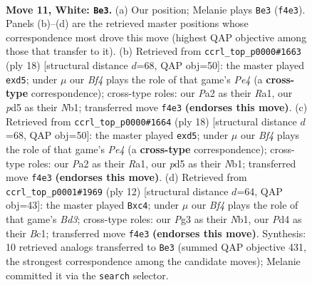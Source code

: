\documentclass[11pt]{article}
\begin{document}
\clearpage

\begin{figure}[p]\centering
\begin{subfigure}{0.46\textwidth}\centering
\resizebox{\linewidth}{!}{%
\newchessgame
\chessboard[
  setfen={rnbqr1k1/p5pp/2pb1n2/1p1p1p2/3P1B2/5NP1/PPQ1PPBP/RN3RK1 w - - 2 11},
  showmover=false,
  pgfstyle=straightmove, color=movearrow, markmove={f4-e3}
]}
\caption{}
\end{subfigure}\hfill
\begin{subfigure}{0.46\textwidth}\centering
\resizebox{\linewidth}{!}{%
\newchessgame
\chessboard[
  setfen={rnbqk2r/pp2ppbp/2n3p1/3p4/4P3/P5P1/1P2NPBP/RNBQK2R w KQkq - 1 10},
  showmover=false,
  pgfstyle=straightmove, color=movearrow, markmove={e4-d5}
]}
\caption{}
\end{subfigure}
\\[4pt]
\begin{subfigure}{0.46\textwidth}\centering
\resizebox{\linewidth}{!}{%
\newchessgame
\chessboard[
  setfen={rnbqk2r/pp2ppbp/2n3p1/3p4/4P3/P5P1/1P2NPBP/RNBQK2R w KQkq - 1 10},
  showmover=false,
  pgfstyle=straightmove, color=movearrow, markmove={e4-d5}
]}
\caption{}
\end{subfigure}\hfill
\begin{subfigure}{0.46\textwidth}\centering
\resizebox{\linewidth}{!}{%
\newchessgame
\chessboard[
  setfen={rn1qkb1r/pbp2ppp/1p2pn2/8/2pP4/3BPN2/PP3PPP/RNBQ1RK1 w kq - 0 7},
  showmover=false,
  pgfstyle=straightmove, color=movearrow, markmove={d3-c4}
]}
\caption{}
\end{subfigure}
\caption{\textbf{Move 11, White: \texttt{Be3}.} (a) Our position; Melanie plays \texttt{Be3} (\texttt{f4e3}). Panels (b)--(d) are the retrieved master positions whose correspondence most drove this move (highest QAP objective among those that transfer to it). (b) Retrieved from \texttt{ccrl\_top\_p0000\#1663} (ply 18) [structural distance $d$=68, QAP obj=50]: the master played \texttt{exd5}; under $\mu$ our \emph{Bf4} plays the role of that game's \emph{Pe4} (a \textbf{cross-type} correspondence); cross-type roles: our \emph{P}a2 as their \emph{R}a1, our \emph{p}d5 as their \emph{N}b1; transferred move \texttt{f4e3} \textbf{(endorses this move)}. (c) Retrieved from \texttt{ccrl\_top\_p0000\#1664} (ply 18) [structural distance $d$=68, QAP obj=50]: the master played \texttt{exd5}; under $\mu$ our \emph{Bf4} plays the role of that game's \emph{Pe4} (a \textbf{cross-type} correspondence); cross-type roles: our \emph{P}a2 as their \emph{R}a1, our \emph{p}d5 as their \emph{N}b1; transferred move \texttt{f4e3} \textbf{(endorses this move)}. (d) Retrieved from \texttt{ccrl\_top\_p0001\#1969} (ply 12) [structural distance $d$=64, QAP obj=43]: the master played \texttt{Bxc4}; under $\mu$ our \emph{Bf4} plays the role of that game's \emph{Bd3}; cross-type roles: our \emph{P}g3 as their \emph{N}b1, our \emph{P}d4 as their \emph{B}c1; transferred move \texttt{f4e3} \textbf{(endorses this move)}. Synthesis: 10 retrieved analogs transferred to \texttt{Be3} (summed QAP objective 431, the strongest correspondence among the candidate moves); Melanie committed it via the \texttt{search} selector.}
\label{fig:thought-m20}
\end{figure}
\end{document}
